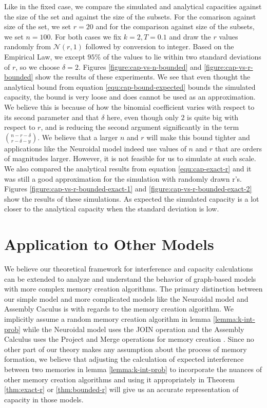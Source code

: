 Like in the fixed case, we compare the simulated and analytical capacities against the size of the set and against the size of the subsets. For the comarison against size of the set, we set $r = 20$ and for the comparison against size of the subsets, we set $n = 100$. For both cases we fix $k=2, T=0.1$ and draw the $r$ values randomly from $\mathcal{N}(r,1)$ followed by conversion to integer. Based on the Empirical Law, we except $95\%$ of the values to lie within two standard deviations of $r$, so we choose $\delta = 2$. Figures \ref{figure:cap-vs-n-bounded} and \ref{figure:cap-vs-r-bounded} show the results of these experiments. We see that even thought the analytical bound from equation \ref{equ:cap-bound-expected} bounds the simulated capacity, the bound is very loose and does cannot be used as an approximation. We believe this is because of how the binomial coefficient varies with respect to its second parameter and that $\delta$ here, even though only $2$ is quite big with respect to $r$, and is reducing the second argument significantly in the term $n - r - \delta \choose r - \delta - y$. We believe that a larger $n$ and $r$ will make this bound tighter and applications like the Neuroidal model indeed use values of $n$ and $r$ that are orders of magnitudes larger. However, it is not feasible for us to simulate at such scale. We also compared the analytical results from equation \ref{equ:cap-exact-r} and it was still a good approximation for the simulation with randomly drawn r's. Figures \ref{figure:cap-vs-r-bounded-exact-1} and \ref{figure:cap-vs-r-bounded-exact-2} show the results of these simulations. As expected the simulated capacity is a lot closer to the analytical capacity when the standard deviation is low. 

\section{Application to Other Models}

We believe our theoretical framework for interference and capacity calculations can be extended to analyze and understand the behavior of graph-based models with more complex memory creation algorithms. The primary distinction between our simple model and more complicated models like the Neuroidal model and Assembly Caculus is with regards to the memory creation algorithm. We implicitly assume a random memory creation algorithm in lemma \ref{lemma:k-int-prob} while the Neuroidal model uses the JOIN operation and the Assembly Calculus uses the Project and Merge operations for memory creation \cite{papadimitriou2020brain, valiant2005memorization}. Since no other part of our theory makes any assumption about the process of memory formation, we believe that adjusting the calculation of expected interference between two memories in lemma \ref{lemma:k-int-prob} to incorporate the nuances of other memory creation algorithms and using it appropriately in Theorem \ref{thm:exact-r} or \ref{thm:bounded-r} will give us an accurate representation of capacity in those models.

